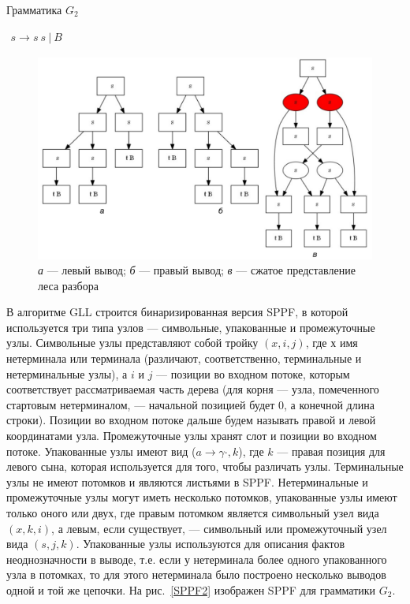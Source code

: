 \documentclass[14pt]{matmex-diploma}
\begin{document}
\begin{listing}
\caption{Грамматика $G_2$}
\label{grmG2}
\centering
$\begin{array}{rl}
s \rightarrow s \ s \ | \ B
\end{array}$
\end{listing}

\begin{figure}
 \centering
 \includegraphics[width=15cm]{pics/SPPF1.pdf}
 \caption{{\it а} --- левый вывод; {\it б} --- правый вывод; {\it в} --- сжатое представление леса разбора }
 \label{SPPF1}
\end{figure}

В алгоритме GLL строится бинаризированная версия SPPF, в которой используется три типа узлов --- символьные, упакованные и промежуточные узлы. Символьные узлы представляют собой тройку $(x, i , j)$, где $х$ имя нетерминала или терминала (различают, соответственно, терминальные и нетерминальные узлы), а $i$ и $j$ --- позиции во входном потоке, которым соответствует рассматриваемая часть дерева (для корня --- узла, помеченного стартовым нетерминалом, --- начальной позицией будет 0, а конечной длина строки). Позиции во входном потоке дальше будем называть правой и левой координатами узла. Промежуточные узлы хранят слот и позиции во входном потоке. Упакованные узлы имеют вид ($ a \rightarrow \gamma \cdot, k$), где $k$ --- правая позиция для левого сына, которая используется для того, чтобы различать узлы. Терминальные узлы не имеют потомков и являются листьями в SPPF. Нетерминальные и промежуточные узлы могут иметь несколько потомков, упакованные узлы имеют только оного или двух, где правым потомком является символьный узел вида $(x, k, i)$, а левым, если существует, --- символьный или промежуточный узел вида $(s, j, k)$. Упакованные узлы используются для описания фактов неоднозначности в выводе, т.е. если у нетерминала более одного упакованного узла в потомках, то для этого нетерминала было построено несколько выводов одной и той же цепочки. На рис.~\ref{SPPF2} изображен SPPF для грамматики $G_2$.
\end{document}
